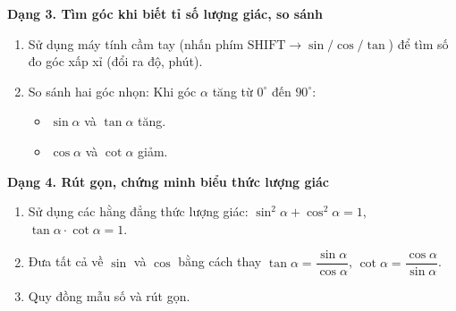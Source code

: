 \textbf{Dạng 3. Tìm góc khi biết tỉ số lượng giác, so sánh}
\begin{enumerate}
\item Sử dụng máy tính cầm tay (nhấn phím $\text{SHIFT} \rightarrow \sin / \cos / \tan$) để tìm số đo góc xấp xỉ (đổi ra độ, phút).
\item So sánh hai góc nhọn: Khi góc $\alpha$ tăng từ $0^\circ$ đến $90^\circ$:
\begin{itemize}
\item $\sin \alpha$ và $\tan \alpha$ tăng.
\item $\cos \alpha$ và $\cot \alpha$ giảm.
\end{itemize}
\end{enumerate}

\textbf{Dạng 4. Rút gọn, chứng minh biểu thức lượng giác}
\begin{enumerate}
\item Sử dụng các hằng đẳng thức lượng giác: $\sin^2\alpha + \cos^2\alpha = 1$, $\tan\alpha \cdot \cot\alpha = 1$.
\item Đưa tất cả về $\sin$ và $\cos$ bằng cách thay $\tan\alpha = \dfrac{\sin\alpha}{\cos\alpha}$, $\cot\alpha = \dfrac{\cos\alpha}{\sin\alpha}$.
\item Quy đồng mẫu số và rút gọn.
\end{enumerate}
